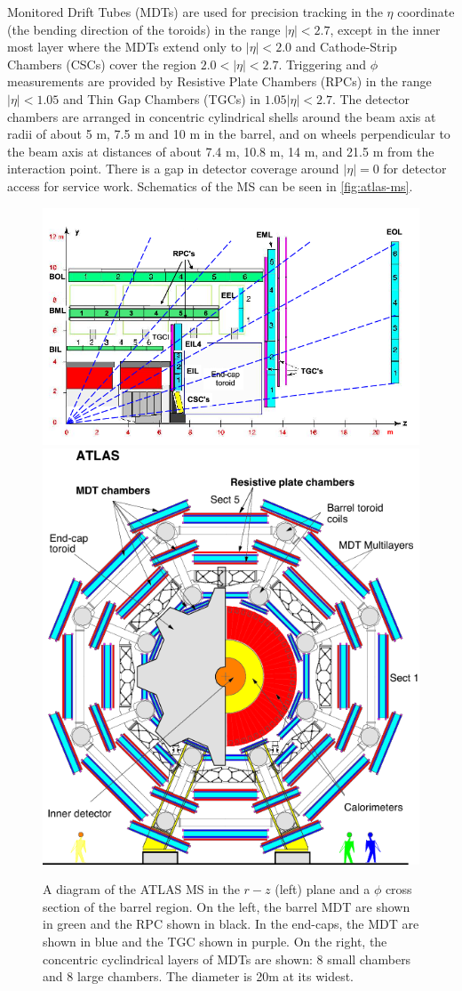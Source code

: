 Monitored Drift Tubes (MDTs) are used for precision tracking in the $\eta$ coordinate (the bending direction of the toroids) in the range $|\eta| < 2.7$, except in the inner most layer where the \ac{MDT}s extend only to $|\eta| < 2.0$ and Cathode-Strip Chambers (CSCs) cover the region $2.0 < |\eta| < 2.7$. Triggering and $\phi$ measurements are provided by Resistive Plate Chambers (RPCs) in the range $|\eta| < 1.05$ and Thin Gap Chambers (TGCs) in $1.05 |\eta| < 2.7$. The detector chambers are arranged in concentric cylindrical shells around the beam axis at radii of about 5 m, 7.5 m and 10 m in the barrel, and on wheels perpendicular to the beam axis at distances of about 7.4 m, 10.8 m, 14 m, and 21.5 m from the interaction point. There is a gap in detector coverage around $|\eta| = 0$ for detector access for service work. Schematics of the \ac{MS} can be seen in \autoref{fig:atlas-ms}.  

\begin{figure}[htbp]
\centering
\includegraphics[width=.6\textwidth]{figures/Detector/atlas-ms.png}
\includegraphics[width=.3\textwidth]{figures/Detector/mdt-phi.png}
\caption{A diagram of the \ac{ATLAS} \ac{MS} in the $r-z$ (left) plane and a $\phi$ cross section of the barrel region. On the left, the barrel \ac{MDT} are shown in green and the \ac{RPC} shown in black. In the end-caps, the \ac{MDT} are shown in blue and the \ac{TGC} shown in purple. On the right, the concentric cyclindrical layers of \ac{MDT}s are shown: 8 small chambers and 8 large chambers. The diameter is 20m at its widest. \cite{ms-vertices}}
\label{fig:atlas-ms}
\end{figure}


